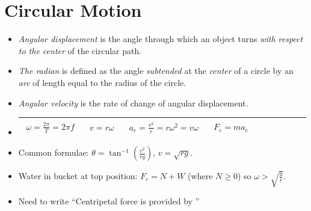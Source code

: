 \documentclass[oneside]{book}
\begin{document}
\chapter{Circular Motion}
\begin{itemize}
    \item \emph{Angular displacement} is the angle through which an object turns \emph{with respect to the center} of the circular path.
    \item \emph{The radian} is defined as the angle \emph{subtended} at the \emph{center} of a circle by an \emph{arc} of length equal to the radius of the circle. 
    \item \emph{Angular velocity} is the rate of change of angular displacement.
\end{itemize}
\begin{itemize}[label=\(\square\)]
    \item \begin{tabular}{|Sc|Sc|Sc|Sc|Sc|}
        \hline
            \(\begin{aligned}
                \omega=\frac{2\pi}{T}=2\pi f
            \end{aligned}\)&
            \(\begin{aligned}
                v=r\omega
            \end{aligned}\)&
            \(\begin{aligned}
                a_c=\frac{v^2}{r}=r\omega^2=v\omega
            \end{aligned}\)&
            \(\begin{aligned}
                F_c=ma_c
            \end{aligned}\)
        \\
        \hline
    \end{tabular}
    \item Common formulae: \(\theta=\tan^{-1}\left(\frac{v^2}{rg}\right)\), \(v=\sqrt{rg}\).
    \item Water in bucket at top position: \(F_c=N+W\) (where \(N\geq 0\)) so \(\omega>\sqrt{\frac{g}{r}}\).
    \item Need to write ``Centripetal force is provided by \underline{\hspace{1cm}}'' 
\end{itemize}
\end{document}
